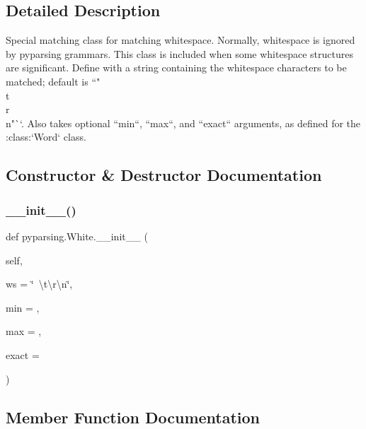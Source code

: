 \subsection{Detailed Description}
\begin{DoxyVerb}Special matching class for matching whitespace.  Normally,
whitespace is ignored by pyparsing grammars.  This class is included
when some whitespace structures are significant.  Define with
a string containing the whitespace characters to be matched; default
is ``" \\t\\r\\n"``.  Also takes optional ``min``,
``max``, and ``exact`` arguments, as defined for the
:class:`Word` class.
\end{DoxyVerb}
 

\subsection{Constructor \& Destructor Documentation}
\mbox{\label{classpyparsing_1_1White_a60dfd63cad0269fe03e48285adae8a0e}} 
\subsubsection{\texorpdfstring{\+\_\+\+\_\+init\+\_\+\+\_\+()}{\_\_init\_\_()}}
{\footnotesize\ttfamily def pyparsing.\+White.\+\_\+\+\_\+init\+\_\+\+\_\+ (\begin{DoxyParamCaption}\item[{}]{self,  }\item[{}]{ws = {\ttfamily \char`\"{}~\textbackslash{}t\textbackslash{}r\textbackslash{}n\char`\"{}},  }\item[{}]{min = {},  }\item[{}]{max = {},  }\item[{}]{exact = {} }\end{DoxyParamCaption})}



\subsection{Member Function Documentation}
\mbox{\label{classpyparsing_1_1White_a19903a5112dfe1489782de1b5eb17f38}} 
